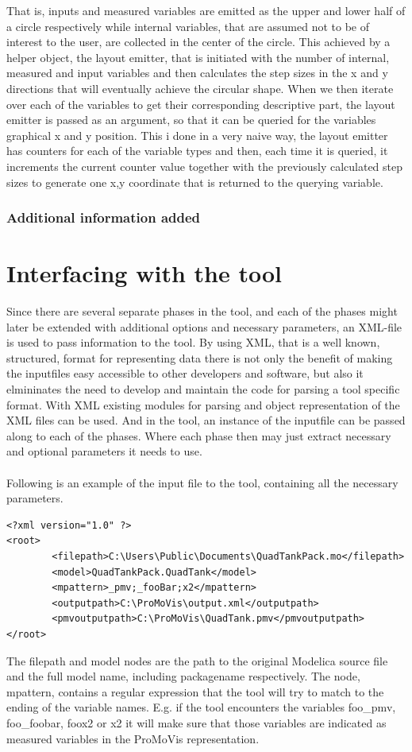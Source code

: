 That is, inputs and measured variables are emitted as the upper and lower half of a circle respectively while internal variables, that are assumed not to be of interest to the user, are collected in the center of the circle. This achieved by a helper object, the layout emitter, that is initiated with the number of internal, measured and input variables and then calculates the step sizes in the x and y directions that will eventually achieve the circular shape. When we then iterate over each of the variables to get their corresponding descriptive part, the layout emitter is passed as an argument, so that it can be queried for the variables graphical x and y position. This i done in a very naive way, the layout emitter has counters for each of the variable types and then, each time it is queried, it increments the current counter value together with the previously calculated step sizes to generate one x,y coordinate that is returned to the querying variable. 
\subsubsection{Additional information added}

\section{Interfacing with the tool}
Since there are several separate phases in the tool, and each of the phases might later be extended with additional options and necessary parameters, an XML-file is used to pass information to the tool. By using XML, that is a well known, structured, format for representing data there is not only the benefit of making the inputfiles easy accessible to other developers and software, but also it elmininates the need to develop and maintain the code for parsing a tool specific format. With XML existing modules for parsing and object representation of the XML files can be used. And in the tool, an instance of the inputfile can be passed along to each of the phases. Where each phase then may just extract necessary and optional parameters it needs to use. \\\\Following is an example of the input file to the tool, containing all the necessary parameters.
\lstset{language=XML}
\begin{lstlisting}
<?xml version="1.0" ?> 
<root>
        <filepath>C:\Users\Public\Documents\QuadTankPack.mo</filepath>
        <model>QuadTankPack.QuadTank</model>
        <mpattern>_pmv;_fooBar;x2</mpattern>
        <outputpath>C:\ProMoVis\output.xml</outputpath>
        <pmvoutputpath>C:\ProMoVis\QuadTank.pmv</pmvoutputpath>
</root>
\end{lstlisting}
The filepath and model nodes are the path to the original Modelica source file and the full model name, including packagename respectively. The node, mpattern, contains a regular expression that the tool will try to match to the ending of the variable names. E.g. if the tool encounters the variables foo\_pmv, foo\_foobar, foox2 or x2 it will make sure that those variables are indicated as measured variables in the ProMoVis representation.


